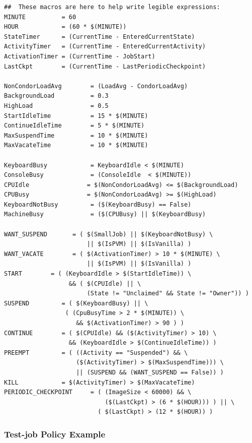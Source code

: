 \begin{verbatim}
##  These macros are here to help write legible expressions:
MINUTE          = 60
HOUR            = (60 * $(MINUTE))
StateTimer      = (CurrentTime - EnteredCurrentState)
ActivityTimer   = (CurrentTime - EnteredCurrentActivity)
ActivationTimer = (CurrentTime - JobStart)
LastCkpt        = (CurrentTime - LastPeriodicCheckpoint)

NonCondorLoadAvg        = (LoadAvg - CondorLoadAvg)
BackgroundLoad          = 0.3
HighLoad                = 0.5
StartIdleTime           = 15 * $(MINUTE)
ContinueIdleTime        = 5 * $(MINUTE)
MaxSuspendTime          = 10 * $(MINUTE)
MaxVacateTime           = 10 * $(MINUTE)

KeyboardBusy            = KeyboardIdle < $(MINUTE)
ConsoleBusy             = (ConsoleIdle  < $(MINUTE))
CPUIdle                = $(NonCondorLoadAvg) <= $(BackgroundLoad)
CPUBusy                = $(NonCondorLoadAvg) >= $(HighLoad)
KeyboardNotBusy         = ($(KeyboardBusy) == False)
MachineBusy             = ($(CPUBusy) || $(KeyboardBusy)

WANT_SUSPEND       = ( $(SmallJob) || $(KeyboardNotBusy) \
                       || $(IsPVM) || $(IsVanilla) )
WANT_VACATE        = ( $(ActivationTimer) > 10 * $(MINUTE) \
                       || $(IsPVM) || $(IsVanilla) )
START        = ( (KeyboardIdle > $(StartIdleTime)) \
                  && ( $(CPUIdle) || \
                       (State != "Unclaimed" && State != "Owner")) )
SUSPEND         = ( $(KeyboardBusy) || \
                 ( (CpuBusyTime > 2 * $(MINUTE)) \
                    && $(ActivationTimer) > 90 ) )
CONTINUE        = ( $(CPUIdle) && ($(ActivityTimer) > 10) \
                  && (KeyboardIdle > $(ContinueIdleTime)) )
PREEMPT	        = ( ((Activity == "Suspended") && \
                    ($(ActivityTimer) > $(MaxSuspendTime))) \
                    || (SUSPEND && (WANT_SUSPEND == False)) )
KILL            = $(ActivityTimer) > $(MaxVacateTime)
PERIODIC_CHECKPOINT     = ( (ImageSize < 60000) && \
                            ($(LastCkpt) > (6 * $(HOUR))) ) || \ 
                          ( $(LastCkpt) > (12 * $(HOUR)) )
\end{verbatim}

\subsubsection{\label{sec:Test-job Policy Example}
Test-job Policy Example}

